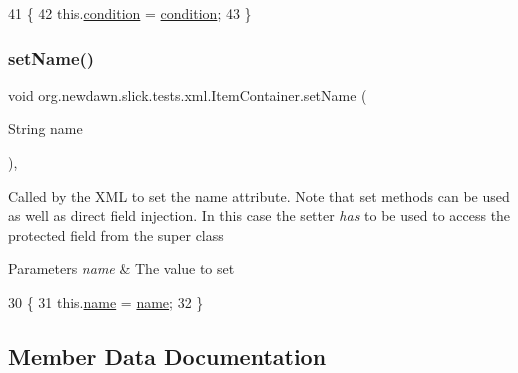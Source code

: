 \begin{DoxyCode}
41                                              \{
42         this.\mbox{\hyperlink{classorg_1_1newdawn_1_1slick_1_1tests_1_1xml_1_1_item_a17a71d3cab0191fbd90b875a6483efea}{condition}} = \mbox{\hyperlink{classorg_1_1newdawn_1_1slick_1_1tests_1_1xml_1_1_item_a17a71d3cab0191fbd90b875a6483efea}{condition}};
43     \}
\end{DoxyCode}
\mbox{\label{classorg_1_1newdawn_1_1slick_1_1tests_1_1xml_1_1_item_container_a3c73d9638d0579da23af1dd37b32008e}} 
\subsubsection{\texorpdfstring{set\+Name()}{setName()}}
{\footnotesize\ttfamily void org.\+newdawn.\+slick.\+tests.\+xml.\+Item\+Container.\+set\+Name (\begin{DoxyParamCaption}\item[{String}]{name }\end{DoxyParamCaption})\hspace{0.3cm}{\ttfamily [inline]}, {\ttfamily [private]}}

Called by the X\+ML to set the name attribute. Note that set methods can be used as well as direct field injection. In this case the setter {\itshape has} to be used to access the protected field from the super class


\begin{DoxyParams}{Parameters}
{\em name} & The value to set \\
\hline
\end{DoxyParams}

\begin{DoxyCode}
30                                       \{
31         this.\mbox{\hyperlink{classorg_1_1newdawn_1_1slick_1_1tests_1_1xml_1_1_item_a5bbf1293e61bcd4d8c543caae4e3c967}{name}} = \mbox{\hyperlink{classorg_1_1newdawn_1_1slick_1_1tests_1_1xml_1_1_item_a5bbf1293e61bcd4d8c543caae4e3c967}{name}};
32     \}
\end{DoxyCode}


\subsection{Member Data Documentation}
\mbox{\label{classorg_1_1newdawn_1_1slick_1_1tests_1_1xml_1_1_item_container_a98670bb826569011f0e9d2d1ea088e83}} 
